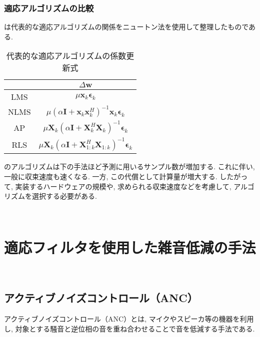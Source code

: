 \subsubsection{適応アルゴリズムの比較}\label{algo-compare}

は代表的な適応アルゴリズムの関係をニュートン法を使用して整理したものである. 

\begin{table}[H]
  \centering
  \caption{代表的な適応アルゴリズムの係数更新式}
  \label{tab:formula}
  \begin{tabular}{|c|c|}
  \hline
       & \(\Delta \bm{w}\)                                                                                             \\ \hline
  LMS  & \( \mu \bm{x}_k \bm{\epsilon}_k \)                                                                         \\ \hline
  NLMS & \( \mu \left( \alpha \bm{I} + \bm{x}_k \bm{x}_k^H \right)^{-1} \bm{x}_k \bm{\epsilon}_k \)        \\ \hline
  AP   & \(\mu \bm{X}_k \left( \alpha \bm{I} + \bm{X}_k^H \bm{X}_k \right)^{-1} \bm{\epsilon}_k\)          \\ \hline
  RLS  & \( \mu \bm{X}_k \left( \alpha \bm{I} + \bm{X}_{1:k}^H \bm{X}_{1:k} \right)^{-1} \bm{\epsilon}_k\) \\ \hline
  \end{tabular}
\end{table}

のアルゴリズムは下の手法ほど予測に用いるサンプル数が増加する. これに伴い, 一般に収束速度も速くなる. 一方, この代償として計算量が増大する. したがって, 実装するハードウェアの規模や, 求められる収束速度などを考慮して, アルゴリズムを選択する必要がある\cite{adaptive_filters}. 

\
\section{適応フィルタを使用した雑音低減の手法}\label{adf-noise-reduction}

\
\subsection{アクティブノイズコントロール（ANC）}\label{anc}

アクティブノイズコントロール（ANC）とは, マイクやスピーカ等の機器を利用し, 対象とする騒音と逆位相の音を重ね合わせることで音を低減する手法である. 

